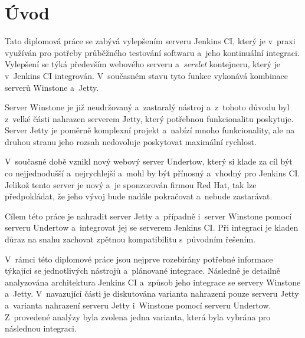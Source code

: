 
\chapter{Úvod}
    Tato diplomová práce se zabývá vylepšením serveru Jenkins CI, který je v~praxi využíván pro potřeby průběžného testování softwaru
    a~jeho kontinuální integraci. Vylepšení se týká především webového serveru a~\emph{servlet} kontejneru, který je v~Jenkins CI integrován. 
    V~současném stavu tyto funkce vykonává kombinace serverů Winstone a~Jetty. 
    
    Server Winstone je již neudržovaný a~zastaralý nástroj a~z~tohoto důvodu
    byl z~velké části nahrazen serverem Jetty, který potřebnou funkcionalitu poskytuje. Server Jetty je poměrně komplexní projekt a~nabízí
    mnoho funkcionality, ale na druhou stranu jeho rozsah nedovoluje poskytovat maximální rychlost.
    
    V~současné době vznikl nový webový server Undertow, který si klade za cíl být co nejjednodušší a~nejrychlejší a~mohl by být přínosný
    a~vhodný pro Jenkins CI. Jelikož tento server je nový a~je sponzorován firmou Red Hat, tak lze předpokládat, že jeho vývoj
    bude nadále pokračovat a~nebude zastarávat.

    Cílem této práce je nahradit server Jetty a~případně i~server Winstone pomocí serveru Undertow 
    a~integrovat jej se serverem Jenkins CI. Při integraci je kladen důraz na snahu
    zachovat zpětnou kompatibilitu s~původním řešením. 

    V~rámci této diplomové práce jsou nejprve rozebírány potřebné informace týkající se jednotlivých nástrojů a~plánované integrace.
    Následně je detailně analyzována architektura Jenkins CI a~způsob jeho integrace se servery Winstone a~Jetty. V~navazující části
    je diskutována varianta nahrazení pouze serveru Jetty a~varianta nahrazení serveru Jetty i~Winstone pomocí serveru Undertow. 
    Z~provedené analýzy byla zvolena jedna varianta, která byla vybrána pro následnou integraci. 


    



